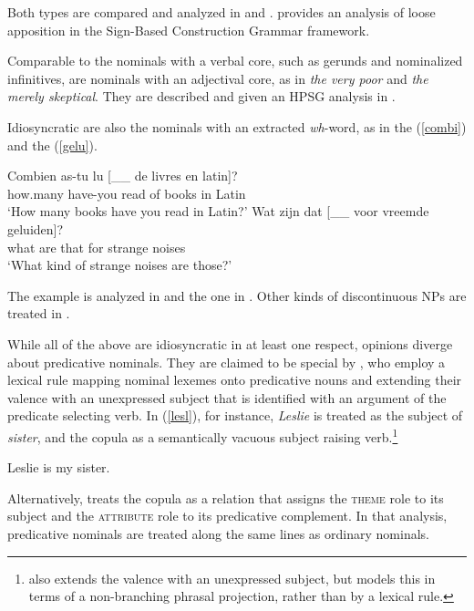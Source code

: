 \documentclass[output=paper
	        ,collection
	        ,collectionchapter
 	        ,biblatex
                ,babelshorthands
                ,newtxmath
                ,draftmode
                ,colorlinks, citecolor=brown
]{langscibook}
\begin{document}
\noindent
Both types are compared and analyzed in \citet{Kim12} and \citet{Kim14}. 
\citet{VanEyndeKim16} provides an analysis of loose apposition in the 
Sign-Based Construction Grammar framework. 

Comparable to the nominals with a verbal core, such as gerunds and nominalized 
infinitives, are nominals with an adjectival core, as in \emph{the very poor} and 
\emph{the merely skeptical}. They are described and given an HPSG analysis 
in \citet{ArnoldSpencer2015}.

Idiosyncratic are also the nominals with an extracted \emph{wh}-word, as in 
the  (\ref{combi}) and the  (\ref{gelu}). 

\begin{exe} 
\ex\label{combi}  
\gll   Combien as-tu lu [\_\_ de livres en latin]?  \\
       how.many have-you read {} of books in Latin  \\ 
\trans `How many books have you read in Latin?' 
\ex\label{gelu}
\gll   Wat zijn dat [\_\_ voor vreemde geluiden]? \\
       what are that {} for strange noises        \\ 
\trans `What kind of strange noises are those?'  
\end{exe} 

\noindent
The  example is analyzed in \citet[20--21]{Abeilleetal04} and the  one in 
\citet[47--50]{VanEynde04}. Other kinds of discontinuous NPs are treated in \citet{deKuthy2002a}. 

While all of the above are idiosyncratic in at least one respect, opinions diverge about 
predicative nominals. They are claimed to be special by \citet[409]{GS00}, who 
employ a lexical rule mapping nominal lexemes onto predicative nouns and 
extending their valence with an unexpressed subject that is identified with an argument of the 
predicate selecting verb. In (\ref{lesl}), for instance, \emph{Leslie} is treated as the subject 
of \emph{sister}, and the copula as a semantically vacuous subject raising 
verb.\footnote{\citet[225]{MuellerPredication} also extends the valence with an unexpressed subject, 
but models this in terms of a non-branching phrasal projection, rather than by a lexical rule.}   

\begin{exe} 
\ex\label{lesl}   Leslie is my sister. 
\end{exe} 
   
\noindent
Alternatively, \citet[158--163]{VanEynde15} treats the copula as a relation that assigns the \textsc{theme} 
role to its subject and the \textsc{attribute} role to its predicative complement. In that analysis, 
predicative nominals are treated along the same lines as ordinary nominals.  
  
\end{document}
